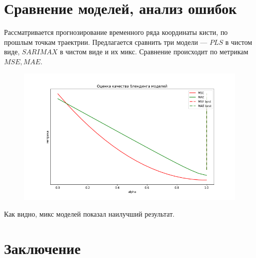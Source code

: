 \documentclass{article}
\begin{document}
\section{Сравнение моделей, анализ ошибок}
Рассматривается прогнозирование временного ряда координаты кисти, по прошлым точкам траектрии. Предлагается сравнить три модели --- $PLS$ в чистом виде, $SARIMAX$ в чистом виде и их микс. Сравнение происходит по метрикам $MSE, MAE$.
\begin{figure}[H]
\includegraphics[scale=1]{images/6.png}
\end{figure}
Как видно, микс моделей показал наилучший результат.
\section{Заключение}



\nocite{*}


\end{document}
